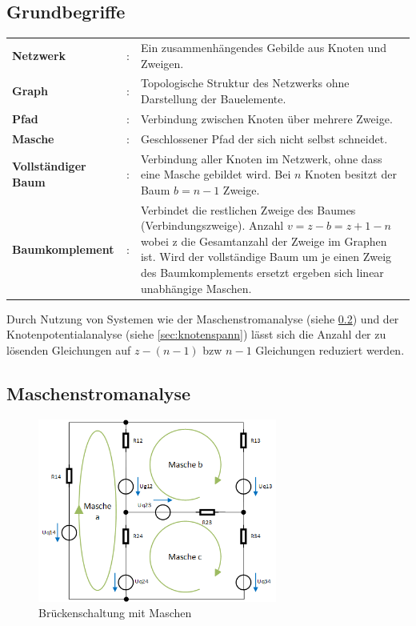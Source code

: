 \documentclass[12pt,a4paper]{article}%
\numberwithin{equation}{section}
\begin{document}
  \subsection{Grundbegriffe}
  \begin{tabularx}{14.7cm}{l l X}
    \textbf{Netzwerk}&: &Ein zusammenhängendes Gebilde aus Knoten und Zweigen. \\
    \textbf{Graph}&: &Topologische Struktur des Netzwerks ohne Darstellung der Bauelemente.\\
    \textbf{Pfad}&: &Verbindung zwischen Knoten über mehrere Zweige.\\
    \textbf{Masche}&: &Geschlossener Pfad der sich nicht selbst schneidet.\\
    \textbf{Vollständiger Baum}&: &Verbindung aller Knoten im Netzwerk, ohne dass eine Masche gebildet wird. Bei $n$ Knoten besitzt der Baum $b = n-1$ Zweige.\\
    \textbf{Baumkomplement}&: &Verbindet die restlichen Zweige des Baumes (Verbindungszweige). Anzahl $v = z-b = z+1-n$ wobei z die Gesamtanzahl der Zweige im Graphen ist. Wird der vollständige Baum um je einen Zweig des Baumkomplements ersetzt ergeben sich linear unabhängige Maschen.\\
  \end{tabularx}  
  \newline
  \newline
  Durch Nutzung von Systemen wie der Maschenstromanalyse (siehe \ref{sec:maschenstr}) und der Knotenpotentialanalyse (siehe \ref{sec:knotenspann}) lässt sich die Anzahl der zu lösenden Gleichungen auf $z-(n-1)$ bzw $n-1$ Gleichungen reduziert werden.
  
  \subsection{Maschenstromanalyse} \label{sec:maschenstr}
  \begin{figure}[htbp] 
  \centering
  \includegraphics[width=0.7\textwidth]{Bruckenschaltung_mit_Maschen.png}
  \caption{Brückenschaltung mit Maschen}
  \label{fig:brueckenschaltung_maschen}
\end{figure}
\end{document}
